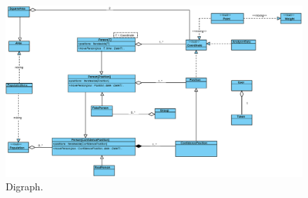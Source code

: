 \begin{figure}[!htb]
\centering
\includegraphics[scale=.7]{figures/class.eps}
\caption{Digraph.}
\label{fig:class}
\end{figure}
